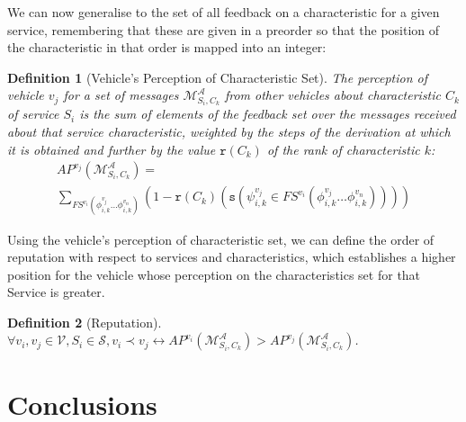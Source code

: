 \documentclass[compsoc, conference, letterpaper, 10pt, times]{IEEEtran}
\newtheorem{definition}{Definition}
\begin{document}
We can now generalise to the set of all feedback on a characteristic for a given service, remembering that these are given in a preorder so that the position of the characteristic in that order is mapped into an integer:


\begin{definition}[Vehicle's Perception of Characteristic Set]
The perception of vehicle $v_{j}$ for a set of messages $\mathcal{M}^{\mathcal{A}}_{S_{i},C_{k}}$ from other vehicles about characteristic $C_{k}$ of service $S_{i}$ is the sum of elements of the feedback set over the messages received about that service characteristic, weighted by the steps of the derivation at which it is obtained and further by the value $\mathtt{r}(C_{k})$ of the rank of characteristic $k$: 
%
\begin{displaymath}
\begin{array}{l}
AP^{v_{j}}(\mathcal{M}^{\mathcal{A}}_{S_{i}, C_{k}})=\\
\sum_{FS^{v_{i}}(\phi^{v_{j}}_{i,k}\dots \phi^{v_{n}}_{i,k})}
(1-\mathtt{r}(C_{k})(\mathtt{s}(\psi^{v_{j}}_{i,k} \in FS^{v_{i}}(\phi^{v_{j}}_{i,k}\dots \phi^{v_{n}}_{i,k}))))
\end{array}
\end{displaymath}

\end{definition}


Using the vehicle's perception of characteristic set, we can define the order of reputation with respect to services and characteristics, which establishes a higher position for the vehicle whose perception on the characteristics set for that Service is greater.

\begin{definition}[Reputation]
$\forall v_{i}, v_{j}\in \mathcal{V}, S_{i}\in \mathcal{S}, v_{i}\prec v_{j} \leftrightarrow AP^{v_{i}}(\mathcal{M}^{\mathcal{A}}_{S_{i}, C_{k}})>AP^{v_{j}}(\mathcal{M}^{\mathcal{A}}_{S_{i}, C_{k}})$.
\end{definition}

\section{Conclusions}
\end{document}
